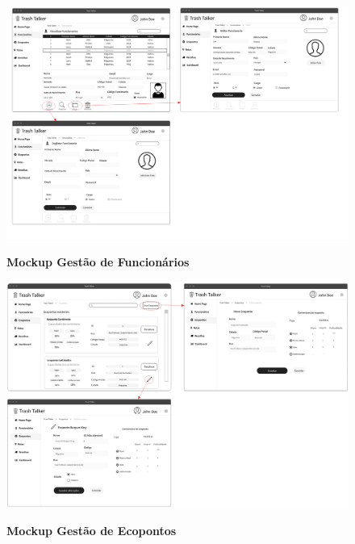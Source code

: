 \documentclass{scrreprt}
\begin{document}
	\begin{figure}[H]
		\centering
		\includegraphics[scale=.23]{imagens/MockupFuncionarios}
		\par \textbf{Mockup Gestão de Funcionários}
		\label{fig:MockupFuncionarios}
	\end{figure}
	\begin{figure}[H]
		\centering
		\includegraphics[scale=.36]{imagens/MockupEcopontos}
		\par \textbf{Mockup Gestão de Ecopontos}
		\label{fig:MockupEcopontos}
	\end{figure}
	\newpage
\end{document}
